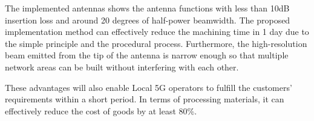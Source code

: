 \documentclass[a4paper,12pt]{report}
\begin{document}
The implemented antennas shows the antenna functions with less than 10dB
insertion loss and around 20 degrees of half-power beamwidth.
The proposed implementation
method can effectively reduce the machining time in 1 day
due to the simple principle and the procedural process.
Furthermore, the high-resolution beam
emitted from the tip of the antenna is narrow enough so
that multiple network areas can be built without interfering with each other.

These advantages will also enable Local 5G operators
to fulfill the customers' requirements within a short period. In terms of
processing materials,
it can effectively reduce the cost of goods by at least
80\%.
\end{document}

